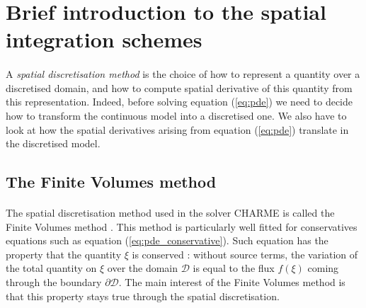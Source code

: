   \section{Brief introduction to the spatial integration schemes}

    \paragraph{}
    A \emph{spatial discretisation method} is the choice of how to represent a quantity over a discretised domain, and how to compute spatial derivative of this quantity from this representation.
    Indeed, before solving equation (\ref{eq:pde}) we need to decide how to transform the continuous model into a discretised one.
    We also have to look at how the spatial derivatives arising from equation (\ref{eq:pde}) translate in the discretised model.

    \subsection{The Finite Volumes method}

      \paragraph{}
      The spatial discretisation method used in the solver CHARME is called the Finite Volumes method \cite{EymardGallouetHerbin2000}.
      This method is particularly well fitted for conservatives equations such as equation (\ref{eq:pde_conservative}).
      Such equation has the property that the quantity $\xi$ is conserved : without source terms, the variation of the total quantity on $\xi$ over the domain $\mathcal{D}$ is equal to the flux $f\left(\xi\right)$ coming through the boundary $\partial\mathcal{D}$.
      The main interest of the Finite Volumes method is that this property stays true through the spatial discretisation.


